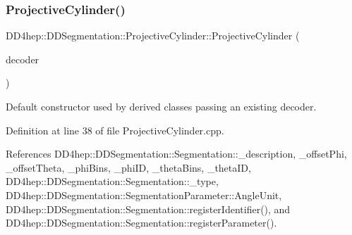 \hypertarget{class_d_d4hep_1_1_d_d_segmentation_1_1_projective_cylinder_afebb5add96b7e183f5e250e5e347f917}{}\label{class_d_d4hep_1_1_d_d_segmentation_1_1_projective_cylinder_afebb5add96b7e183f5e250e5e347f917} 
\subsubsection{\texorpdfstring{Projective\+Cylinder()}{ProjectiveCylinder()}\hspace{0.1cm}{\footnotesize\ttfamily [2/2]}}
{\footnotesize\ttfamily D\+D4hep\+::\+D\+D\+Segmentation\+::\+Projective\+Cylinder\+::\+Projective\+Cylinder (\begin{DoxyParamCaption}\item[{\hyperlink{class_d_d4hep_1_1_d_d_segmentation_1_1_bit_field64}{Bit\+Field64} $\ast$}]{decoder }\end{DoxyParamCaption})}



Default constructor used by derived classes passing an existing decoder. 



Definition at line 38 of file Projective\+Cylinder.\+cpp.



References D\+D4hep\+::\+D\+D\+Segmentation\+::\+Segmentation\+::\+\_\+description, \+\_\+offset\+Phi, \+\_\+offset\+Theta, \+\_\+phi\+Bins, \+\_\+phi\+ID, \+\_\+theta\+Bins, \+\_\+theta\+ID, D\+D4hep\+::\+D\+D\+Segmentation\+::\+Segmentation\+::\+\_\+type, D\+D4hep\+::\+D\+D\+Segmentation\+::\+Segmentation\+Parameter\+::\+Angle\+Unit, D\+D4hep\+::\+D\+D\+Segmentation\+::\+Segmentation\+::register\+Identifier(), and D\+D4hep\+::\+D\+D\+Segmentation\+::\+Segmentation\+::register\+Parameter().

\hypertarget{class_d_d4hep_1_1_d_d_segmentation_1_1_projective_cylinder_a0177b7d45729494e87f22d74aa0f872a}{}\label{class_d_d4hep_1_1_d_d_segmentation_1_1_projective_cylinder_a0177b7d45729494e87f22d74aa0f872a} 
